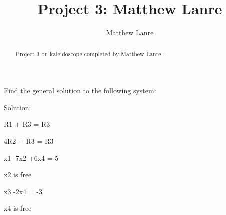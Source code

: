 \documentclass{ximera}
\title{Project 3: Matthew Lanre}
\author{Matthew Lanre}
\begin{document}
\begin{abstract}
    Project 3 on kaleidoscope completed by Matthew Lanre .
\end{abstract}

\maketitle

\begin{problem}

Find the general solution to the following system: 

      
\end{problem}


Solution:

R1 + R3 = R3     


4R2 + R3 = R3   


x1 -7x2 +6x4 = 5

x2 is free

x3 -2x4 = -3

x4 is free
\end{document}

